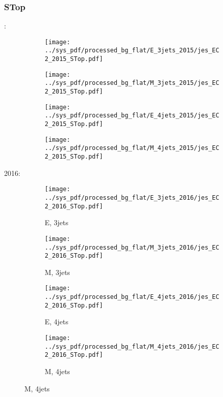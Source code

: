 \documentclass{beamer}
\begin{document}
\begin{frame}
\frametitle{STop}
\fontsize{5}{1}:
\begin{figure}
\centering
\begin{subfigure}[b]{0.24\textwidth}
\texttt{[image: ../sys\_pdf/processed\_bg\_flat/E\_3jets\_2015/jes\_EC2\_2015\_STop.pdf]}
\end{subfigure}
\begin{subfigure}[b]{0.24\textwidth}
\texttt{[image: ../sys\_pdf/processed\_bg\_flat/M\_3jets\_2015/jes\_EC2\_2015\_STop.pdf]}
\end{subfigure}
\begin{subfigure}[b]{0.24\textwidth}
\texttt{[image: ../sys\_pdf/processed\_bg\_flat/E\_4jets\_2015/jes\_EC2\_2015\_STop.pdf]}
\end{subfigure}
\begin{subfigure}[b]{0.24\textwidth}
\texttt{[image: ../sys\_pdf/processed\_bg\_flat/M\_4jets\_2015/jes\_EC2\_2015\_STop.pdf]}
\end{subfigure}
\end{figure}
2016:
\begin{figure}
\centering
\begin{subfigure}[b]{0.24\textwidth}
\texttt{[image: ../sys\_pdf/processed\_bg\_flat/E\_3jets\_2016/jes\_EC2\_2016\_STop.pdf]}
\captionsetup{font=tiny}
\caption{E, 3jets}
\end{subfigure}
\begin{subfigure}[b]{0.24\textwidth}
\texttt{[image: ../sys\_pdf/processed\_bg\_flat/M\_3jets\_2016/jes\_EC2\_2016\_STop.pdf]}
\captionsetup{font=tiny}
\caption{M, 3jets}
\end{subfigure}
\begin{subfigure}[b]{0.24\textwidth}
\texttt{[image: ../sys\_pdf/processed\_bg\_flat/E\_4jets\_2016/jes\_EC2\_2016\_STop.pdf]}
\captionsetup{font=tiny}
\caption{E, 4jets}
\end{subfigure}
\begin{subfigure}[b]{0.24\textwidth}
\texttt{[image: ../sys\_pdf/processed\_bg\_flat/M\_4jets\_2016/jes\_EC2\_2016\_STop.pdf]}
\captionsetup{font=tiny}
\caption{M, 4jets}
\end{subfigure}
\end{figure}
\end{frame}
\end{document}
